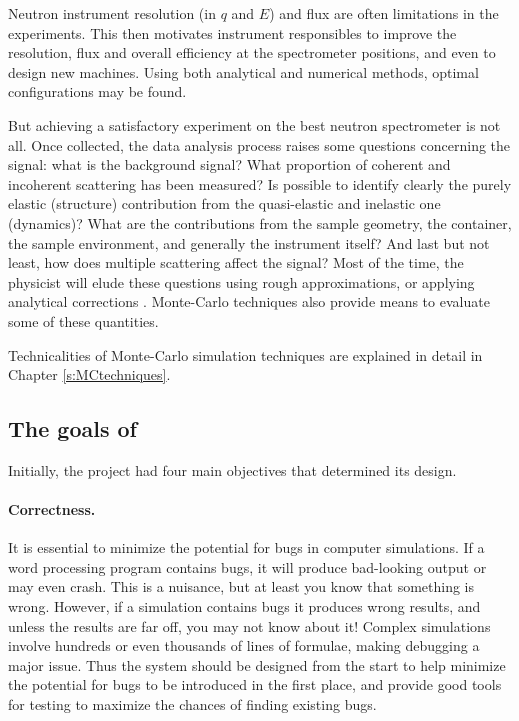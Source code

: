Neutron instrument resolution (in $q$ and $E$) and flux are often limitations in the
experiments. This then motivates instrument responsibles to improve
the resolution, flux and overall efficiency at the spectrometer positions, and
even to design new machines. Using both analytical and numerical
methods, optimal configurations may be found.

But achieving a satisfactory experiment on the best neutron
spectrometer is not all. Once collected, the data analysis process
raises some questions concerning the signal: what is the background
signal? What proportion of coherent and incoherent scattering has
been measured? Is possible to identify clearly the purely elastic
(structure) contribution from the quasi-elastic and inelastic one
(dynamics)? What are the contributions from the sample geometry, the
container, the sample environment, and generally the instrument
itself? And last but not least, how does multiple scattering affect the
signal? Most of the time, the physicist will elude these questions
using rough approximations, or applying analytical corrections
\cite{Copley86}. Monte-Carlo techniques also provide means to evaluate
some of these quantities.

Technicalities of Monte-Carlo simulation
techniques are explained in detail in Chapter \ref{s:MCtechniques}.

\subsection{The goals of \MCS}
\label{s:goals}

Initially, the \MCS project had four main objectives
that determined its design.

\paragraph{Correctness.}
It is essential to minimize the potential for bugs in computer
simulations.  If a word processing program contains bugs, it will
produce bad-looking output or may even crash. This is a nuisance, but at
least you know that something is wrong. However, if a simulation
contains bugs it produces wrong results, and unless the results are far
off, you may not know about it! Complex simulations involve hundreds or
even thousands of lines of formulae, making debugging a major issue. Thus the
system should be designed from the start to help minimize the potential
for bugs to be introduced in the first place, and provide good tools for
testing to maximize the chances of finding existing bugs.
%
